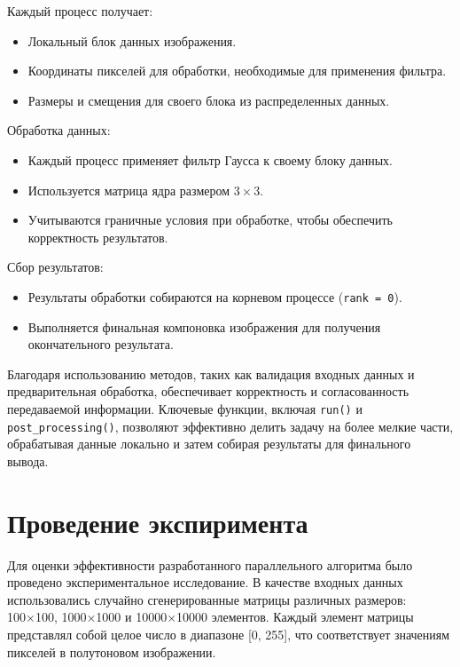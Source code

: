 \documentclass[14pt]{extarticle}
\theoremstyle{definition}
\theoremstyle{remark}
\begin{document}
Каждый процесс получает:
\begin{itemize}
    \item Локальный блок данных изображения.
    \item Координаты пикселей для обработки, необходимые для применения фильтра.
    \item Размеры и смещения для своего блока из распределенных данных.\\
\end{itemize}

Обработка данных:
\begin{itemize}
    \item Каждый процесс применяет фильтр Гаусса к своему блоку данных.
    \item Используется матрица ядра размером $3 \times 3$.
    \item Учитываются граничные условия при обработке, чтобы обеспечить корректность результатов.\\
\end{itemize}

Сбор результатов:
\begin{itemize}
    \item Результаты обработки собираются на корневом процессе (\texttt{rank = 0}).
    \item Выполняется финальная компоновка изображения для получения окончательного результата.\\
\end{itemize}

Благодаря использованию методов, таких как валидация входных данных и предварительная обработка, обеспечивает корректность и согласованность передаваемой информации. Ключевые функции, включая \texttt{run()} и \texttt{post\_processing()}, позволяют эффективно делить задачу на более мелкие части, обрабатывая данные локально и затем собирая результаты для финального вывода.

\clearpage
\section{Проведение экспиримента}

Для оценки эффективности разработанного параллельного алгоритма было проведено экспериментальное исследование. В качестве входных данных использовались случайно сгенерированные матрицы различных размеров: 100×100, 1000×1000 и 10000×10000 элементов. Каждый элемент матрицы представлял собой целое число в диапазоне [0, 255], что соответствует значениям пикселей в полутоновом изображении.
\end{document}
